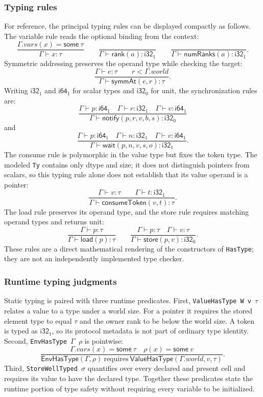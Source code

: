 \documentclass[a4paper,USenglish]{lipics-v2021}
\begin{document}
\subsubsection{Typing rules}
For reference, the principal typing rules can be displayed compactly as
follows. The variable rule reads the optional binding from the context:
\[
\frac{\Gamma.vars(x)=\mathsf{some}\ \tau}
  {\Gamma\vdash x:\tau}
\qquad
\frac{}{\Gamma\vdash \mathsf{rank}(a):\mathsf{i32}_1}
\qquad
\frac{}{\Gamma\vdash \mathsf{numRanks}(a):\mathsf{i32}_1}.
\]
Symmetric addressing preserves the operand type while checking the target:
\[
\frac{\Gamma\vdash e:\tau \qquad r<\Gamma.world}
  {\Gamma\vdash \mathsf{symmAt}(e,r):\tau}.
\]
Writing \(\mathsf{i32}_1\) and \(\mathsf{i64}_1\) for scalar types and
\(\mathsf{i32}_0\) for unit, the synchronization rules are:
\[
\frac{\Gamma\vdash p:\mathsf{i64}_1\quad
   \Gamma\vdash r:\mathsf{i32}_1\quad
   \Gamma\vdash v:\mathsf{i64}_1}
  {\Gamma\vdash \mathsf{notify}(p,r,v,b,s):\mathsf{i32}_0}
\]
and
\[
\frac{\Gamma\vdash p:\mathsf{i64}_1\quad
   \Gamma\vdash n:\mathsf{i32}_1\quad
   \Gamma\vdash v:\mathsf{i64}_1}
  {\Gamma\vdash \mathsf{wait}(p,n,v,s,o):\mathsf{i32}_1}.
\]
The consume rule is polymorphic in the value type but fixes the token type. The
modeled \texttt{Ty} contains only dtype and size; it does not distinguish
pointers from scalars, so this typing rule alone does not establish that its
value operand is a pointer:
\[
\frac{\Gamma\vdash v:\tau\qquad\Gamma\vdash t:\mathsf{i32}_1}
  {\Gamma\vdash \mathsf{consumeToken}(v,t):\tau}.
\]
The load rule preserves its operand type, and the store rule requires matching
operand types and returns unit:
\[
\frac{\Gamma\vdash p:\tau}{\Gamma\vdash \mathsf{load}(p):\tau}
\qquad
\frac{\Gamma\vdash p:\tau\quad\Gamma\vdash v:\tau}
  {\Gamma\vdash \mathsf{store}(p,v):\mathsf{i32}_0}.
\]
These rules are a direct mathematical rendering of the constructors of
\texttt{HasType}; they are not an independently implemented type checker.

\subsubsection{Runtime typing judgments}
Static typing is paired with three runtime predicates. First,
\texttt{ValueHasType W v $\tau$} relates a value to a type under a world size.
For a pointer it requires the stored element type to equal \(\tau\) and the
owner rank to be below the world size. A token is typed as \(\mathsf{i32}_1\),
so its protocol metadata is not part of ordinary type identity. Second,
\texttt{EnvHasType $\Gamma$ $\rho$} is pointwise:
\[
\frac{\Gamma.vars(x)=\mathsf{some}\ \tau\quad
   \rho(x)=\mathsf{some}\ v}
  {\mathsf{EnvHasType}(\Gamma,\rho)\ \text{requires}\
   \mathsf{ValueHasType}(\Gamma.world,v,\tau)}.
\]
Third, \texttt{StoreWellTyped $\sigma$} quantifies over every declared and
present cell and requires its value to have the declared type. Together these
predicates state the runtime portion of type safety without requiring every
variable to be initialized.
\end{document}
